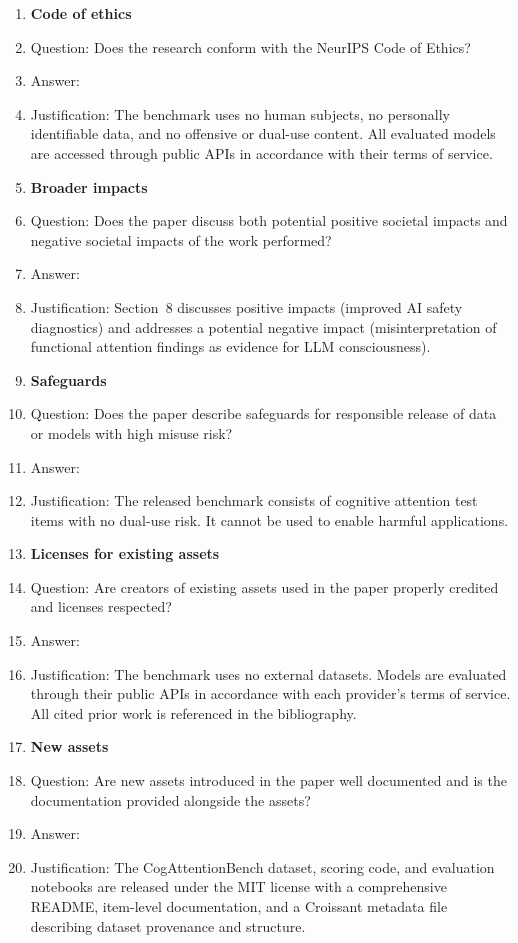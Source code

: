 \documentclass{article}
\begin{document}
\begin{enumerate}
\item \textbf{Code of ethics}
    \item[] Question: Does the research conform with the NeurIPS Code of Ethics?
    \item[] Answer: \answerYes{}
    \item[] Justification: The benchmark uses no human subjects, no personally identifiable data, and no offensive or dual-use content. All evaluated models are accessed through public APIs in accordance with their terms of service.

\item \textbf{Broader impacts}
    \item[] Question: Does the paper discuss both potential positive societal impacts and negative societal impacts of the work performed?
    \item[] Answer: \answerYes{}
    \item[] Justification: Section~8 discusses positive impacts (improved AI safety diagnostics) and addresses a potential negative impact (misinterpretation of functional attention findings as evidence for LLM consciousness).

\item \textbf{Safeguards}
    \item[] Question: Does the paper describe safeguards for responsible release of data or models with high misuse risk?
    \item[] Answer: \answerNA{}
    \item[] Justification: The released benchmark consists of cognitive attention test items with no dual-use risk. It cannot be used to enable harmful applications.

\item \textbf{Licenses for existing assets}
    \item[] Question: Are creators of existing assets used in the paper properly credited and licenses respected?
    \item[] Answer: \answerYes{}
    \item[] Justification: The benchmark uses no external datasets. Models are evaluated through their public APIs in accordance with each provider's terms of service. All cited prior work is referenced in the bibliography.

\item \textbf{New assets}
    \item[] Question: Are new assets introduced in the paper well documented and is the documentation provided alongside the assets?
    \item[] Answer: \answerYes{}
    \item[] Justification: The CogAttentionBench dataset, scoring code, and evaluation notebooks are released under the MIT license with a comprehensive README, item-level documentation, and a Croissant metadata file describing dataset provenance and structure.


\end{enumerate}
\end{document}
